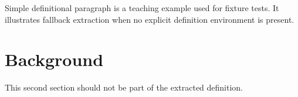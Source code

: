 \documentclass[12pt]{article}
\begin{document}
Simple definitional paragraph is a teaching example used for fixture tests. It illustrates fallback extraction when no explicit definition environment is present.

\section{Background}
This second section should not be part of the extracted definition.
\end{document}
